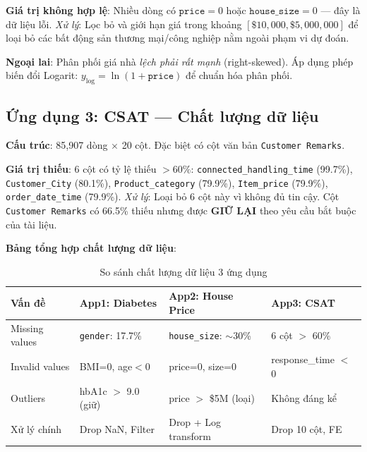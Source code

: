 \documentclass[12pt, a4paper]{article}
\begin{document}
\textbf{Giá trị không hợp lệ}: Nhiều dòng có $\texttt{price} = 0$ hoặc $\texttt{house\_size} = 0$ — đây là dữ liệu lỗi. \textit{Xử lý}: Lọc bỏ và giới hạn giá trong khoảng $[\$10{,}000, \$5{,}000{,}000]$ để loại bỏ các bất động sản thương mại/công nghiệp nằm ngoài phạm vi dự đoán.

\textbf{Ngoại lai}: Phân phối giá nhà \textit{lệch phải rất mạnh} (right-skewed). Áp dụng phép biến đổi Logarit: $y_{\log} = \ln(1 + \texttt{price})$ để chuẩn hóa phân phối.

\subsection{Ứng dụng 3: CSAT — Chất lượng dữ liệu}

\textbf{Cấu trúc}: 85,907 dòng $\times$ 20 cột. Đặc biệt có cột văn bản \texttt{Customer Remarks}.

\textbf{Giá trị thiếu}: 6 cột có tỷ lệ thiếu $> 60\%$: \texttt{connected\_handling\_time} (99.7\%), \texttt{Customer\_City} (80.1\%), \texttt{Product\_category} (79.9\%), \texttt{Item\_price} (79.9\%), \texttt{order\_date\_time} (79.9\%). \textit{Xử lý}: Loại bỏ 6 cột này vì không đủ tin cậy. Cột \texttt{Customer Remarks} có 66.5\% thiếu nhưng được \textbf{GIỮ LẠI} theo yêu cầu bắt buộc của tài liệu.

\textbf{Bảng tổng hợp chất lượng dữ liệu}:

\begin{table}[H]
\centering
\caption{So sánh chất lượng dữ liệu 3 ứng dụng}
\label{tab:data_quality}
\small
\begin{tabularx}{\textwidth}{|l|X|X|X|}
\hline
\textbf{Vấn đề} & \textbf{App1: Diabetes} & \textbf{App2: House Price} & \textbf{App3: CSAT} \\
\hline
Missing values & \texttt{gender}: 17.7\% & \texttt{house\_size}: $\sim$30\% & 6 cột $>$ 60\% \\
\hline
Invalid values & BMI=0, age$<$0 & price=0, size=0 & response\_time $<$ 0 \\
\hline
Outliers & hbA1c $>$ 9.0 (giữ) & price $>$ \$5M (loại) & Không đáng kể \\
\hline
Xử lý chính & Drop NaN, Filter & Drop + Log transform & Drop 10 cột, FE \\
\hline
\end{tabularx}
\end{table}

\end{document}
